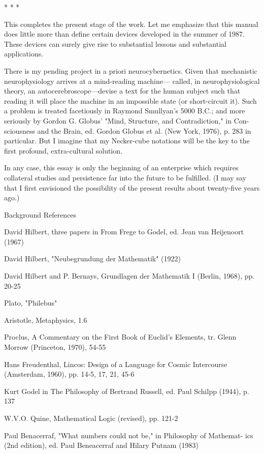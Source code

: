 * * * 


This completes the present stage of the work. Let me emphasize 
that this manual does little more than define certain devices developed 
in the summer of 1987. These devices can surely give rise to substantial 
lessons and substantial applications. 

There is my pending project in a priori neurocybernetics. Given 
that mechanistic neurophysiology arrives at a mind-reading machine--- 
called, in neurophysiological theory, an autocerebroscope---devise a 
text for the human subject such that reading it will place the machine in 
an impossible state (or short-circuit it). Such a problem is treated 
facetiously in Raymond Smullyan's 5000 B.C.; and more seriously by 
Gordon G. Globus' "Mind, Structure, and Contradiction," in Con- 
sciousness and the Brain, ed. Gordon Globus et al. (New York, 1976), p. 
283 in particular. But I imagine that my Necker-cube notations will be 
the key to the first profound, extra-cultural solution. 

In any case, this essay is only the beginning of an enterprise which 
requires collateral studies and persistence far into the future to be 
fulfilled. (I may say that I first envisioned the possibility of the present 
results about twenty-five years ago.) 


Background References 


David Hilbert, three papers in From Frege to Godel, ed. Jean van Heijenoort 
(1967) 

David Hilbert, "Neubegrundung der Mathematik" (1922) 

David Hilbert and P. Bernays, Grundlagen der Mathematik I (Berlin, 1968), 
pp. 20-25 

Plato, "Philebus" 

Aristotle, Metaphysics, 1.6 

Proclus, A Commentary on the First Book of Euclid's Elements, tr. Glenn 
Morrow (Princeton, 1970), 54-55 

Hans Freudenthal, Lincos: Design of a Language for Cosmic Intercourse 
(Amsterdam, 1960), pp. 14-5, 17, 21, 45-6 

Kurt Godel in The Philosophy of Bertrand Russell, ed. Paul Schilpp (1944), p. 
137 

W.V.O. Quine, Mathematical Logic (revised), pp. 121-2 

Paul Benacerraf, "What numbers could not be," in Philosophy of Mathemat- 
ics (2nd edition), ed. Paul Beneacerraf and Hilary Putnam (1983) 

